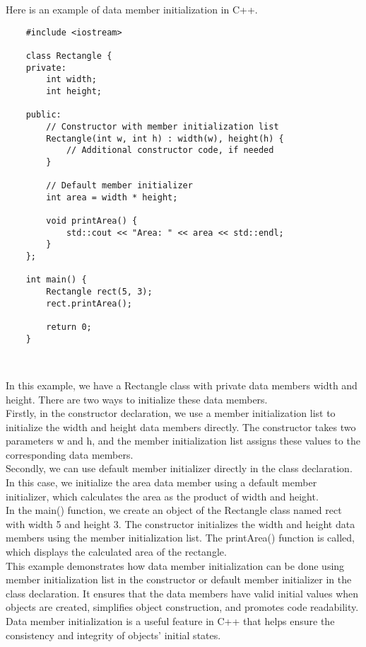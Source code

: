 \begin{solution}
    Here is an example of data member initialization in C++. \\
    \horizontalline
    \begin{verbatim}
    #include <iostream>

    class Rectangle {
    private:
        int width;
        int height;
    
    public:
        // Constructor with member initialization list
        Rectangle(int w, int h) : width(w), height(h) {
            // Additional constructor code, if needed
        }
    
        // Default member initializer
        int area = width * height;
    
        void printArea() {
            std::cout << "Area: " << area << std::endl;
        }
    };
    
    int main() {
        Rectangle rect(5, 3);
        rect.printArea();
    
        return 0;
    }        
    \end{verbatim} \\
    \horizontalline

    In this example, we have a Rectangle class with private data members width and height. There are two ways to initialize these data members. \\

    \noindent Firstly, in the constructor declaration, we use a member initialization list to initialize the width and height data members directly. The constructor takes two parameters w and h, and the member initialization 
    list assigns these values to the corresponding data members. \\

    \noindent Secondly, we can use default member initializer directly in the class declaration. In this case, we initialize the area data member using a default member initializer, which calculates the area as the product 
    of width and height. \\

    \noindent In the main() function, we create an object of the Rectangle class named rect with width 5 and height 3. The constructor initializes the width and height data members using the member initialization list. The 
    printArea() function is called, which displays the calculated area of the rectangle. \\

    \noindent This example demonstrates how data member initialization can be done using member initialization list in the constructor or default member initializer in the class declaration. It ensures that the data members 
    have valid initial values when objects are created, simplifies object construction, and promotes code readability. Data member initialization is a useful feature in C++ that helps ensure the consistency and integrity of 
    objects' initial states. \\
\end{solution}

